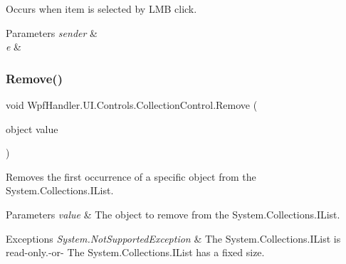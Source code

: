 Occurs when item is selected by L\+MB click. 


\begin{DoxyParams}{Parameters}
{\em sender} & \\
\hline
{\em e} & \\
\hline
\end{DoxyParams}
\mbox{\label{class_wpf_handler_1_1_u_i_1_1_controls_1_1_collection_control_acc5c3b3a95e4d58b6cda68e5f61089fd}} 
\subsubsection{\texorpdfstring{Remove()}{Remove()}}
{\footnotesize\ttfamily void Wpf\+Handler.\+U\+I.\+Controls.\+Collection\+Control.\+Remove (\begin{DoxyParamCaption}\item[{object}]{value }\end{DoxyParamCaption})}



Removes the first occurrence of a specific object from the System.\+Collections.\+I\+List. 


\begin{DoxyParams}{Parameters}
{\em value} & The object to remove from the System.\+Collections.\+I\+List.\\
\hline
\end{DoxyParams}

\begin{DoxyExceptions}{Exceptions}
{\em System.\+Not\+Supported\+Exception} & The System.\+Collections.\+I\+List is read-\/only.-\/or-\/ The System.\+Collections.\+I\+List has a fixed size. \\
\hline
\end{DoxyExceptions}
\mbox{\label{class_wpf_handler_1_1_u_i_1_1_controls_1_1_collection_control_ab9ea70c06d17283a4e07195b0f9b0de7}} 
